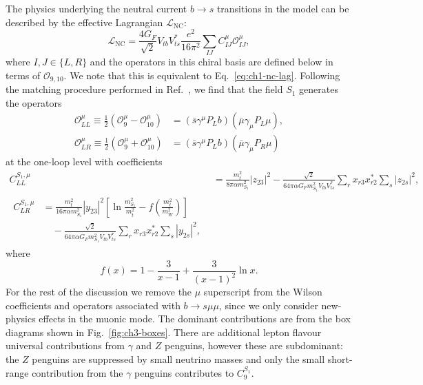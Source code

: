 The physics underlying the neutral current $b \rightarrow s$ transitions in the
model can be described by the effective Lagrangian $\mathscr{L}_{\text{NC}}$:
\begin{equation}
  \mathscr{L}_{\text{NC}} = \frac{4 G_F}{\sqrt{2}} V_{tb} V^*_{ts} \frac{e^{2}}{16\pi^{2}} \sum_{IJ} C^\mu_{IJ}  \mathscr{O}^{\mu}_{IJ},
\end{equation}
where $I,J \in \{L, R\}$ and the operators in this chiral basis are defined
below in terms of $\mathscr{O}_{9,10}$. We note that this is equivalent to
Eq.~\eqref{eq:ch1-nc-lag}. Following the matching procedure performed in
Ref.~\cite{Misiak:1992bc}, we find that the field $S_{1}$ generates the
operators
\begin{equation}
  \begin{split}
  \mathscr{O}_{LL}^\mu \equiv
  \frac{1}{2}(\mathscr{O}_9^\mu - \mathscr{O}_{10}^\mu)
  &= (\bar{s}\gamma^\mu P_L b)(\bar{\mu} \gamma_\mu P_L \mu),\\
  \mathscr{O}_{LR}^\mu  \equiv
  \frac{1}{2}(\mathscr{O}_9^\mu + \mathscr{O}_{10}^\mu)
  &= (\bar{s}\gamma^\mu P_L
  b)(\bar{\mu}\gamma_\mu P_R \mu)
  \end{split}
\end{equation}
at the one-loop level with coefficients~\cite{Bauer:2015knc}
\begin{subequations} \label{eq:ch3-cllclreqs}
  \begin{align}
    C_{LL}^{S_{1},\mu} &= \frac{m_t^2}{8 \pi \alpha m_{S_{1}}^2}|z_{23}|^2 -
                         \frac{\sqrt{2}}{64\pi \alpha G_F m_{S_{1}}^2 V_{tb}V^*_{ts}}\sum_r x_{r 3}
                         x_{r 2}^* \sum_s |z_{2 s}|^2 , \label{eq:ch3-cll}\\
    \begin{split}
      C_{LR}^{S_{1},\mu} &= \frac{m_t^2}{16 \pi \alpha m_{S_{1}}^2}|y_{2 3}|^2
      \left[ \ln \frac{m_{S_{1}}^2}{m_t^2} - f \left( \frac{m_t^2}{m_W^2} \right)
      \right]\\ &\quad - \frac{\sqrt{2}}{64\pi \alpha G_F m_{S_{1}}^2
        V_{tb}V^*_{ts}}\sum_r x_{r 3} x_{r 2}^* \sum_s |y_{2 s}|^2, \label{eq:ch3-clr}
    \end{split}
  \end{align}
\end{subequations}
where
\begin{equation}
  f(x) = 1 - \frac{3}{x - 1} + \frac{3}{(x - 1)^2} \ln x.
\end{equation}
For the rest of the discussion we remove the $\mu$ superscript from the Wilson
coefficients and operators associated with $b \to s \mu \mu$, since we only
consider new-physics effects in the muonic mode. The dominant contributions are
from the box diagrams shown in Fig.~\ref{fig:ch3-boxes}. There are additional lepton
flavour universal contributions from $\gamma$ and $Z$ penguins, however these are
subdominant: the $Z$ penguins are suppressed by small neutrino masses and only
the small short-range contribution from the $\gamma$ penguins contributes to
$C^{S_{1}}_9$.

